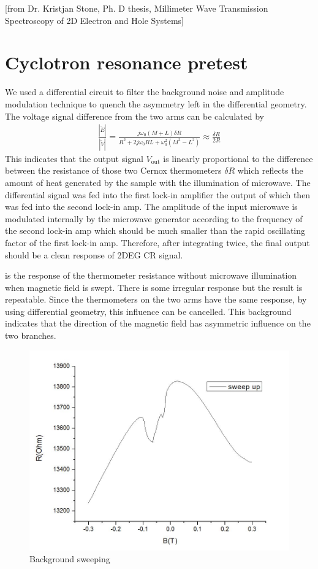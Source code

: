 \documentclass[12pt]{ruthesis}
\begin{document}
[from Dr. Kristjan Stone, Ph. D thesis, Millimeter Wave Transmission Spectroscopy of 2D Electron and Hole Systems] 

\section{Cyclotron resonance pretest}\label{Cyclotron}


 
We used a differential circuit to filter the background noise and amplitude modulation technique to quench the asymmetry left in the differential geometry.
The voltage signal difference from the two arms can be calculated by
\begin{align} 
\frac{|\tilde{E}|}{|\tilde{V}|}=\frac{j \omega_{0}(M+L)\delta R}{R^{2}+2j \omega_{0}RL + \omega_{0}^{2} (M^{2}-L^{2})} \approx \frac{\delta R}{2R}
\end{align} 
This indicates that the output signal $V_{\mathrm{out}}$ is linearly proportional to the difference between the resistance of those two Cernox thermometers $\delta R$ which reflects the amount of heat generated by the sample with the illumination of microwave.
The differential signal was fed into the first lock-in amplifier the output of which then was fed into the second lock-in amp. 
The amplitude of the input microwave is modulated internally by the microwave generator according to the frequency of the second lock-in amp which should be much smaller than the rapid oscillating factor of the first lock-in amp. 
Therefore, after integrating twice, the final output should be a clean response of 2DEG CR signal.     
 
 is the response of the thermometer resistance without microwave illumination when magnetic field is swept. There is some irregular response but the result is repeatable. Since the thermometers on the two arms have the same response, by using differential geometry, this influence can be cancelled.
This background indicates that the direction of the magnetic field has asymmetric influence on the two branches. 
\begin{figure}
  \centering
  \includegraphics[scale=0.25]{figures/R(B)UP.JPG}
  \caption{Background sweeping}
  \label{r(b)}
\end{figure}
\end{document}
